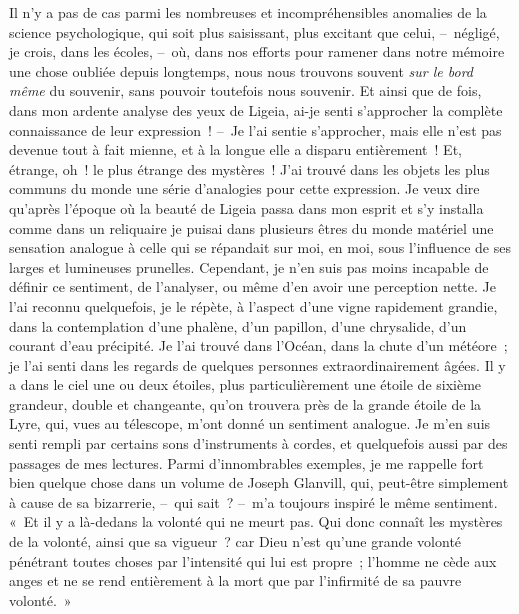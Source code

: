\documentclass[french,twoside]{book} %
\begin{document}
Il n’y a pas de cas parmi les nombreuses et incompréhensibles anomalies de la science psychologique, qui soit plus saisissant, plus excitant que celui, – négligé, je crois, dans les écoles, – où, dans nos efforts pour ramener dans notre mémoire une chose oubliée depuis longtemps, nous nous trouvons souvent \emph{sur le bord même} du souvenir, sans pouvoir toutefois nous souvenir. Et ainsi que de fois, dans mon ardente analyse des yeux de Ligeia, ai-je senti s’approcher la complète connaissance de leur expression ! – Je l’ai sentie s’approcher, mais elle n’est pas devenue tout à fait mienne, et à la longue elle a disparu entièrement ! Et, étrange, oh ! le plus étrange des mystères ! J’ai trouvé dans les objets les plus communs du monde une série d’analogies pour cette expression. Je veux dire qu’après l’époque où la beauté de Ligeia passa dans mon esprit et s’y installa comme dans un reliquaire je puisai dans plusieurs êtres du monde matériel une sensation analogue à celle qui se répandait sur moi, en moi, sous l’influence de ses larges et lumineuses prunelles. Cependant, je n’en suis pas moins incapable de définir ce sentiment, de l’analyser, ou même d’en avoir une perception nette. Je l’ai reconnu quelquefois, je le répète, à l’aspect d’une vigne rapidement grandie, dans la contemplation d’une phalène, d’un papillon, d’une chrysalide, d’un courant d’eau précipité. Je l’ai trouvé dans l’Océan, dans la chute d’un météore ; je l’ai senti dans les regards de quelques personnes extraordinairement âgées. Il y a dans le ciel une ou deux étoiles, plus particulièrement une étoile de sixième grandeur, double et changeante, qu’on trouvera près de la grande étoile de la Lyre, qui, vues au télescope, m’ont donné un sentiment analogue. Je m’en suis senti rempli par certains sons d’instruments à cordes, et quelquefois aussi par des passages de mes lectures. Parmi d’innombrables exemples, je me rappelle fort bien quelque chose dans un volume de Joseph Glanvill, qui, peut-être simplement à cause de sa bizarrerie, – qui sait ? – m’a toujours inspiré le même sentiment. « Et il y a là-dedans la volonté qui ne meurt pas. Qui donc connaît les mystères de la volonté, ainsi que sa vigueur ? car Dieu n’est qu’une grande volonté pénétrant toutes choses par l’intensité qui lui est propre ; l’homme ne cède aux anges et ne se rend entièrement à la mort que par l’infirmité de sa pauvre volonté. »\par
\end{document}
